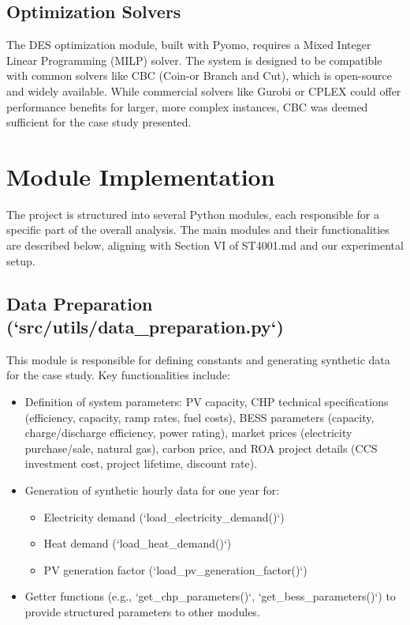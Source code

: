 \subsection{Optimization Solvers}
The DES optimization module, built with Pyomo, requires a Mixed Integer Linear Programming (MILP) solver. The system is designed to be compatible with common solvers like CBC (Coin-or Branch and Cut), which is open-source and widely available. While commercial solvers like Gurobi or CPLEX could offer performance benefits for larger, more complex instances, CBC was deemed sufficient for the case study presented.

\section{Module Implementation}

The project is structured into several Python modules, each responsible for a specific part of the overall analysis. The main modules and their functionalities are described below, aligning with Section VI of ST4001.md and our experimental setup.

\subsection{Data Preparation (`src/utils/data_preparation.py`)}
This module is responsible for defining constants and generating synthetic data for the case study. Key functionalities include:
\begin{itemize}
    \item Definition of system parameters: PV capacity, CHP technical specifications (efficiency, capacity, ramp rates, fuel costs), BESS parameters (capacity, charge/discharge efficiency, power rating), market prices (electricity purchase/sale, natural gas), carbon price, and ROA project details (CCS investment cost, project lifetime, discount rate).
    \item Generation of synthetic hourly data for one year for:
    \begin{itemize}
        \item Electricity demand (`load_electricity_demand()`)
        \item Heat demand (`load_heat_demand()`)
        \item PV generation factor (`load_pv_generation_factor()`)
    \end{itemize}
    \item Getter functions (e.g., `get_chp_parameters()`, `get_bess_parameters()`) to provide structured parameters to other modules.
\end{itemize}

